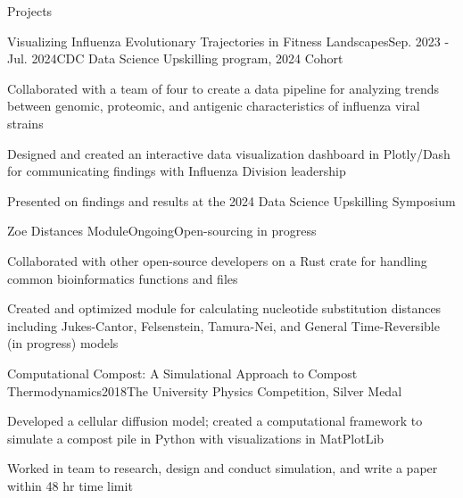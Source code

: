\documentclass{resume} %
\begin{document}
\begin{rSection}{Projects}
\begin{rSubsection}{Visualizing Influenza Evolutionary Trajectories in Fitness Landscapes}{Sep. 2023 - Jul. 2024}{CDC Data Science Upskilling program, 2024 Cohort}{}
\item Collaborated with a team of four to create a data pipeline for analyzing trends between genomic, proteomic, and antigenic characteristics of influenza viral strains
\item Designed and created an interactive data visualization dashboard in Plotly/Dash for communicating findings with Influenza Division leadership
\item Presented on findings and results at the 2024 Data Science Upskilling Symposium
\end{rSubsection}

\begin{rSubsection}{Zoe Distances Module}{Ongoing}{Open-sourcing in progress}{}
\item Collaborated with other open-source developers on a Rust crate for handling common bioinformatics functions and files
\item Created and optimized module for calculating nucleotide substitution distances including Jukes-Cantor, Felsenstein, Tamura-Nei, and General Time-Reversible (in progress) models
\end{rSubsection}

\begin{rSubsection}{Computational Compost: A Simulational Approach to Compost Thermodynamics}{2018}{The University Physics Competition, Silver Medal}{}
\item Developed a cellular diffusion model; created a computational framework to simulate a compost pile in Python with visualizations in MatPlotLib
\item Worked in team to research, design and conduct simulation, and write a paper within 48 hr time limit
\end{rSubsection}


\end{rSection}
\end{document}
